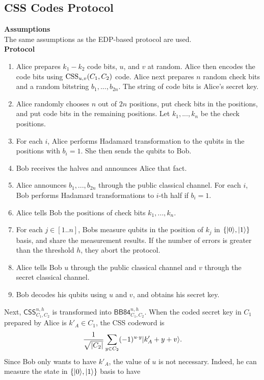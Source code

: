 \subsection*{CSS Codes Protocol}
{\bf Assumptions}\\
 The same assumptions as the EDP-based protocol are used.\\
{\bf Protocol}
\begin{enumerate}
\item Alice prepares $k_1 - k_2$ code bits, $u$, and $v$ at random.
      Alice then encodes the code bits using $\mathrm{CSS}_{u,v}(C_1,C_2)$ code.
      Alice next prepares $n$ random check bits
      and a random bitstring $b_{1},...,b_{2n}$. 
      The string of code bits is Alice's secret key.
\item Alice randomly chooses $n$ out of $2n$ positions,
      put check bits in the positions, and put code bits in the
      remaining positions. Let $k_1,...,k_n$ be the check positions.
\item For each $i$, Alice performs Hadamard 
      transformation to the qubits in the positions with
      $b_i = 1$. She then sends the qubits to Bob.
\item Bob receives the halves and announces Alice that fact.
\item Alice announces $b_1,...,b_{2n}$
      through the public classical channel. For each $i$, Bob
      performs Hadamard transformations to $i$-th half if
      $b_i = 1$.
\item Alice tells Bob the positions of check bits $k_1,...,k_n$.
\item For each $j \in [1..n]$, 
      Bobs measure qubits in the position of $k_j$ in
      $\{|0\rangle,|1\rangle\}$ basis,
      and share the measurement results.
      If the number of errors is greater than the threshold $h$, 
      they abort the protocol.
\item Alice tells Bob $u$ through the public classical channel and
      $v$ through the secret classical channel.
\item Bob decodes his qubits using $u$ and $v$, and obtains 
      his secret key.
\end{enumerate}
Next, $\mathsf{CSS}^{n,h}_{C_1,C_2}$ is transformed into 
$\mathsf{BB84}^{n,h}_{C_1,C_2}$. When the coded secret key in $C_1$
prepared by Alice is $k'_A \in C_1$, the CSS codeword is
\[
 \frac{1}{\sqrt{|C_2|}}\sum_{y \in C_2}(-1)^{u \cdot y}
 |k'_A+y+v\rangle.
\]
Since Bob only wants to have $k'_A$, the value of $u$ is not necessary.
Indeed, he can measure the state in $\{|0\rangle, |1\rangle\}$ basis to have
